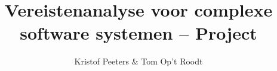 \documentclass[11pt,a4paper,oneside]{book}
\begin{document}
\frontmatter



\title{Vereistenanalyse voor complexe software systemen -- Project}
\author{Kristof Peeters & Tom Op't Roodt}

\tableofcontents

\mainmatter






\end{document}
